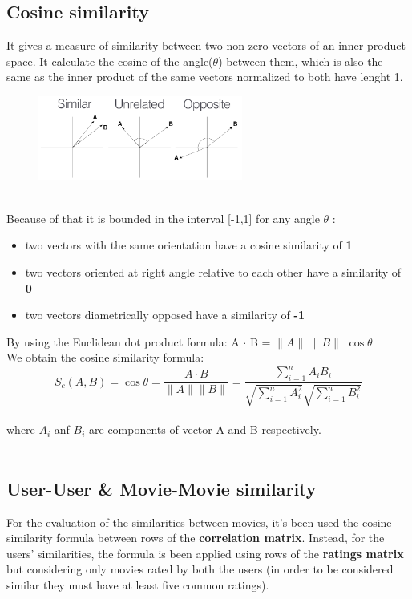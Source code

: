 \documentclass{article}
\begin{document}
\subsection{Cosine similarity}
It gives a measure of similarity between two non-zero vectors of an inner product space. It calculate the cosine of the angle($\theta$) between them, which is also the same as the inner product of the same vectors normalized to both have lenght 1. \\
\begin{figure}[ht]
      \begin{center}
            \includegraphics[width=0.6\textwidth]{images/cosine.png}
      \end{center}
\end{figure}\\
Because of that it is bounded in the interval [-1,1] for any angle $\theta$ :
\begin{itemize}
      \item two vectors with the same orientation have a cosine similarity of \textbf{1}
      \item two vectors oriented at right angle relative to each other have a similarity of \textbf{0}
      \item two vectors diametrically opposed have a similarity of \textbf{-1}
\end{itemize}
By using the Euclidean dot product formula:      A $\cdot$ B = $\|A\|$ $\|B\|$ $\cos\theta$ \\
We obtain the cosine similarity formula:\\
\begin{equation}
      S_c(A,B) = \cos\theta = \frac{A \cdot B}{\|A\| \|B\|} = \frac{\sum_{i=1}^n A_i B_i}{\sqrt{\sum_{i=1}^n A_i^2}\sqrt{\sum_{i=1}^n B_i^2}}
\end{equation}\\
where $A_i$ anf $B_i$ are components of vector A and B respectively.\\ \\


\subsection{User-User \& Movie-Movie similarity}
For the evaluation of the similarities between movies, it's been used the cosine similarity formula between rows of the \textbf{correlation matrix}. Instead, for the users' similarities, the formula is been applied using rows of the \textbf{ratings matrix} but considering only movies rated by both the users (in order to be considered similar they must have at least five common ratings).\\
\end{document}
